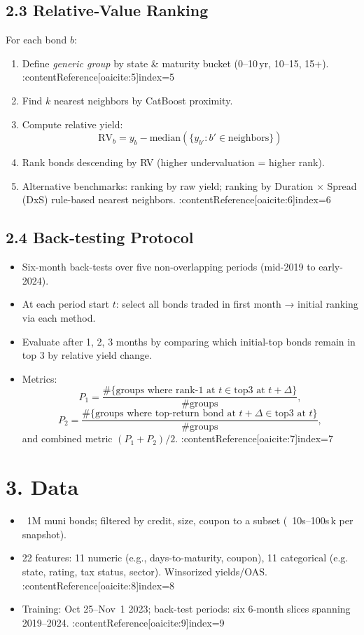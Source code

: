 \documentclass{article}
\begin{document}
\subsection*{2.3 Relative‑Value Ranking}
For each bond \(b\):
\begin{enumerate}
  \item Define \emph{generic group} by state & maturity bucket (0–10 yr, 10–15, 15+). :contentReference[oaicite:5]{index=5}
  \item Find $k$ nearest neighbors by CatBoost proximity.
  \item Compute relative yield:
  \[
    \text{RV}_b = y_b - \text{median}(\{y_{b'}: b' \in \text{neighbors}\})
  \]
  \item Rank bonds descending by RV (higher undervaluation = higher rank).
  \item Alternative benchmarks: ranking by raw yield; ranking by Duration × Spread (DxS) rule-based nearest neighbors. :contentReference[oaicite:6]{index=6}
\end{enumerate}

\subsection*{2.4 Back‑testing Protocol}
\begin{itemize}
  \item Six-month back-tests over five non-overlapping periods (mid-2019 to early-2024).
  \item At each period start \(t\): select all bonds traded in first month → initial ranking via each method.
  \item Evaluate after 1, 2, 3 months by comparing which initial-top bonds remain in top 3 by relative yield change.
  \item Metrics:
  \[
   P_1 = \frac{\#\{\text{groups where rank-1 at }t\in\text{top3 at }t+\Delta\}}{\text{#groups}},
  \]
  \[
   P_2 = \frac{\#\{\text{groups where top-return bond at }t+\Delta\in \text{top3 at }t\}}{\text{#groups}},
  \]
  and combined metric \( (P_1+P_2)/2 \). :contentReference[oaicite:7]{index=7}
\end{itemize}

\section*{3. Data}
\begin{itemize}
  \item ~1M muni bonds; filtered by credit, size, coupon to a subset (~10s–100s k per snapshot).
  \item 22 features: 11 numeric (e.g., days-to-maturity, coupon), 11 categorical (e.g. state, rating, tax status, sector). Winsorized yields/OAS. :contentReference[oaicite:8]{index=8}
  \item Training: Oct 25–Nov 1 2023; back-test periods: six 6‑month slices spanning 2019–2024. :contentReference[oaicite:9]{index=9}
\end{itemize}
\end{document}
